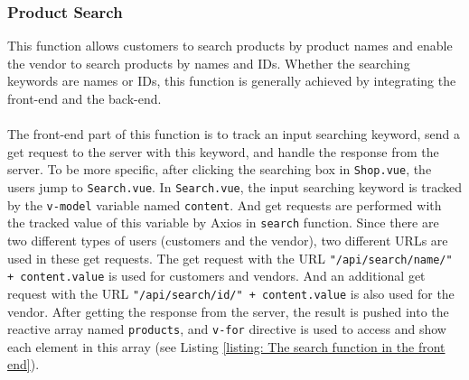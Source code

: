 \documentclass{article}
\begin{document}
\subsubsection{Product Search}
This function allows customers to search products by product names and enable the vendor to search products by names and IDs. Whether the searching keywords are names or IDs, this function is generally achieved by integrating the front-end and the back-end. 
\\\\
The front-end part of this function is to track an input searching keyword, send a get request to the server with this keyword, and handle the response from the server. To be more specific, after clicking the searching box in \verb|Shop.vue|, the users jump to \verb|Search.vue|. In \verb|Search.vue|, the input searching keyword is tracked by the \verb|v-model| variable named \verb|content|. And get requests are performed with the tracked value of this variable by Axios in \verb|search| function. Since there are two different types of users (customers and the vendor), two different URLs are used in these get requests. The get request with the URL \verb|"/api/search/name/" + content.value| is used for customers and vendors. And an additional get request with the URL \verb|"/api/search/id/" + content.value| is also used for the vendor. After getting the response from the server, the result is pushed into the reactive array named \verb|products|, and \verb|v-for| directive is used to access and show each element in this array (see Listing \ref{listing: The search function in the front end}).
\\\\
\end{document}
